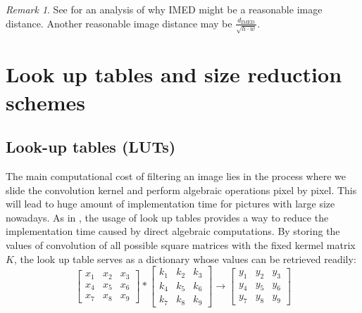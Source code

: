 \documentclass[12pt]{amsart}
\theoremstyle{definition}
\theoremstyle{remark}
\newtheorem{rem}[thm]{Remark}
\numberwithin{thm}{section}
\begin{document}
\begin{rem}
See \cite{FWZ05} for an analysis of why IMED might be a reasonable image distance. Another reasonable image distance may be $\frac{d_\text{IMED}}{\sqrt{h\cdot w}}$.
\end{rem}



\section{Look up tables and size reduction schemes}\label{section: look up table}

\subsection{Look-up tables (LUTs)}
The main computational cost of filtering an image lies in the process where we slide the convolution kernel and perform algebraic operations pixel by pixel. This will lead to huge amount of implementation time for pictures with large size nowadays. As in \cite{WSLQE06}, 
the usage of look up tables %
provides a way to reduce the implementation time caused by direct algebraic computations. By storing the values of convolution of all possible square matrices with the fixed kermel matrix $K$, the look up table serves as a dictionary whose values can be retrieved readily:   
$$
\begin{bmatrix}
x_1 & x_2 & x_3\\
x_4 & x_5 & x_6\\
x_7 & x_8 & x_9
\end{bmatrix}
*
\begin{bmatrix}
k_1 & k_2 & k_3\\
k_4 & k_5 & k_6\\
k_7 & k_8 & k_9
\end{bmatrix}
\longrightarrow
\begin{bmatrix}
y_1 & y_2 & y_3\\
y_4 & y_5 & y_6\\
y_7 & y_8 & y_9
\end{bmatrix}
$$
\end{document}
